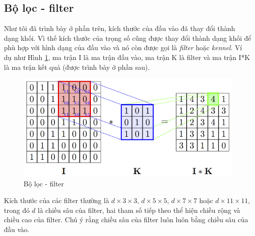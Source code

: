 \subsection{Bộ lọc - filter}
Như tôi đã trình bày ở phần trên, kích thước của đầu vào đã thay đổi thành dạng khối. Vì thế kích thước của trọng số cũng được thay đổi thành dạng khối để phù hợp với hình dạng của đầu vào và nó còn được gọi là \textit{filter} hoặc \textit{kennel}.  Ví dụ như Hình \ref{fig:filter}, ma trận I là ma trận đầu vào, ma trận K là filter và ma trận I*K là ma trận kết quả (được trình bày ở phần sau).
\begin{center}
\begin{figure}[htp]
	\begin{center}
		\includegraphics[scale=1.2]{chap4/image/minhHoaTichChap.png}
	\end{center}
	\caption{Bộ lọc - filter}
	\label{fig:filter}
\end{figure}
\end{center}
Kích thước của các filter thường là $d\times3\times3$, $d\times5\times5$, $d\times7\times7$  hoặc $d\times11\times11$, trong đó $d$ là chiều sâu của filter, hai tham số tiếp theo thể hiện chiều rộng và chiều cao của filter. Chú ý rằng chiều sâu của filter luôn luôn bằng chiều sâu của đầu vào.
